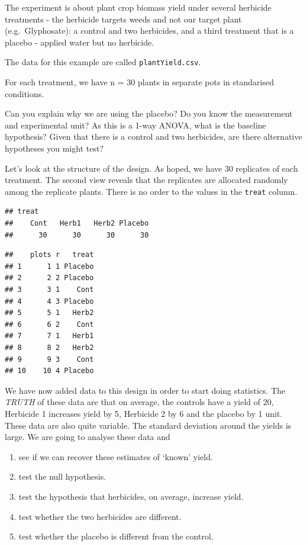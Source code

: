 \documentclass[
]{book}
\providecommand{\tightlist}{%
  \setlength{\itemsep}{0pt}\setlength{\parskip}{0pt}}
\begin{document}
The experiment is about plant crop biomass yield under several herbicide treatments - the herbicide targets weeds and not our target plant (e.g.~Glyphosate): a control and two herbicides, and a third treatment that is a placebo - applied water but no herbicide.

The data for this example are called \texttt{plantYield.csv}.

For each treatment, we have n = 30 plants in separate pots in standarised conditions.

Can you explain why we are using the placebo? Do you know the measurement and experimental unit? As this is a 1-way ANOVA, what is the baseline hypothesis? Given that there is a control and two herbicides, are there alternative hypotheses you might test?

Let's look at the structure of the design. As hoped, we have 30 replicates of each treatment. The second view reveals that the replicates are allocated randomly among the replicate plants. There is no order to the values in the \texttt{treat} column.

\begin{verbatim}
## treat
##    Cont   Herb1   Herb2 Placebo 
##      30      30      30      30
\end{verbatim}

\begin{verbatim}
##    plots r   treat
## 1      1 1 Placebo
## 2      2 2 Placebo
## 3      3 1    Cont
## 4      4 3 Placebo
## 5      5 1   Herb2
## 6      6 2    Cont
## 7      7 1   Herb1
## 8      8 2   Herb2
## 9      9 3    Cont
## 10    10 4 Placebo
\end{verbatim}

We have now added data to this design in order to start doing statistics. The \emph{TRUTH} of these data are that on average, the controls have a yield of 20, Herbicide 1 increases yield by 5, Herbicide 2 by 6 and the placebo by 1 unit. These data are also quite variable. The standard deviation around the yields is large. We are going to analyse these data and

\begin{enumerate}
\def\labelenumi{\arabic{enumi}.}
\tightlist
\item
  see if we can recover these estimates of `known' yield.
\item
  test the null hypothesis.
\item
  test the hypothesis that herbicides, on average, increase yield.
\item
  test whether the two herbicides are different.
\item
  test whether the placebo is different from the control.
\end{enumerate}
\end{document}
